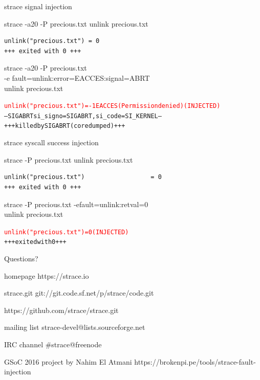 \documentclass[unicode]{beamer}
\begin{document}
\begin{frame}[fragile]{strace signal injection}
\scriptsize
\begin{block}{\large strace -a20 -P precious.txt unlink precious.txt}
\begin{verbatim}
unlink("precious.txt") = 0
+++ exited with 0 +++
\end{verbatim}
\end{block}
\begin{block}{\large strace -a20 -P precious.txt \\ -e fault=unlink:error=EACCES:signal=ABRT \\ unlink precious.txt}
\begin{alltt}
\textcolor{red}{unlink("precious.txt") = -1 EACCES (Permission denied) (INJECTED)}
--- SIGABRT {si_signo=SIGABRT, si_code=SI_KERNEL} ---
+++ killed by SIGABRT (core dumped) +++
\end{alltt}
\end{block}
\end{frame}

\begin{frame}[fragile]{strace syscall success injection}
\scriptsize
\begin{block}{\large strace -P precious.txt unlink precious.txt}
\begin{verbatim}
unlink("precious.txt")                  = 0
+++ exited with 0 +++
\end{verbatim}
\end{block}
\begin{block}{\large strace -P precious.txt -efault=unlink:retval=0 \\ unlink precious.txt}
\begin{alltt}
\textcolor{red}{unlink("precious.txt")                  = 0 (INJECTED)}
+++ exited with 0 +++
\end{alltt}
\end{block}
\end{frame}

\begin{frame}{Questions?}
\begin{block}{\large homepage}
	https://strace.io
\end{block}
\begin{block}{\large strace.git}
	git://git.code.sf.net/p/strace/code.git

	https://github.com/strace/strace.git
\end{block}
\begin{block}{\large mailing list}
	strace-devel@lists.sourceforge.net
\end{block}
\begin{block}{\large IRC channel}
	\#strace@freenode
\end{block}
\begin{block}{\large GSoC 2016 project by Nahim El Atmani}
	https://brokenpi.pe/tools/strace-fault-injection
\end{block}
\end{frame}
\end{document}
